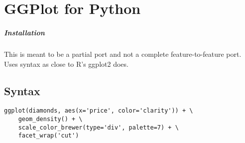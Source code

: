 \chapter{GGPlot for Python}

\paragraph{Installation} 
This is meant to be a partial port and not a complete 
feature-to-feature port. Uses syntax as close to R's ggplot2
does. 

\section{Syntax}
\begin{verbatim}
ggplot(diamonds, aes(x='price', color='clarity')) + \
	geom_density() + \
	scale_color_brewer(type='div', palette=7) + \
	facet_wrap('cut')
\end{verbatim}

